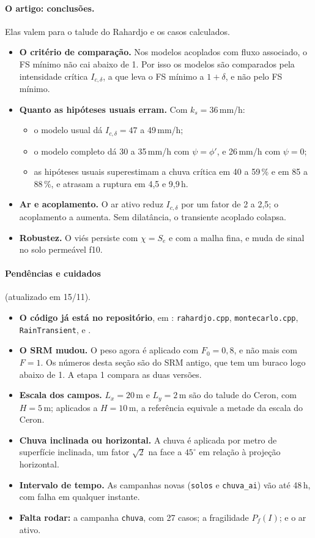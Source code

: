 \paragraph{O artigo: conclusões.} Elas valem para o talude do Rahardjo e os casos calculados.
\begin{itemize}
  \item \textbf{O critério de comparação.} Nos modelos acoplados com fluxo associado, o FS mínimo não cai abaixo de 1.
    Por isso os modelos são comparados pela intensidade crítica $I_{c,\delta}$, a que leva o FS mínimo a $1 + \delta$,
    e não pelo FS mínimo.
  \item \textbf{Quanto as hipóteses usuais erram.} Com $k_s = 36$\,mm/h:
    \begin{itemize}
      \item o modelo usual dá $I_{c,\delta} = 47$ a 49\,mm/h;
      \item o modelo completo dá 30 a 35\,mm/h com $\psi = \phi'$, e 26\,mm/h com $\psi = 0$;
      \item as hipóteses usuais superestimam a chuva crítica em 40 a 59\,\% e em 85 a 88\,\%, e atrasam a ruptura em
        4,5 e 9,9\,h.
    \end{itemize}
  \item \textbf{Ar e acoplamento.} O ar ativo reduz $I_{c,\delta}$ por um fator de 2 a 2,5; o acoplamento a aumenta. Sem
    dilatância, o transiente acoplado colapsa.
  \item \textbf{Robustez.} O viés persiste com $\chi = S_e$ e com a malha fina, e muda de sinal no solo permeável f10.
\end{itemize}

\paragraph{Pendências e cuidados} (atualizado em 15/11).
\begin{itemize}
  \item \textbf{O código já está no repositório}, em : \texttt{rahardjo.cpp},
    \texttt{montecarlo.cpp}, \texttt{RainTransient},  e .
  \item \textbf{O SRM mudou.} O peso agora é aplicado com $F_0 = 0{,}8$, e não mais com $F = 1$. Os números desta seção
    são do SRM antigo, que tem um buraco logo abaixo de 1. A etapa 1 compara as duas versões.
  \item \textbf{Escala dos campos.} $L_x = 20$\,m e $L_y = 2$\,m são do talude do Ceron, com $H = 5$\,m; aplicados a
    $H = 10$\,m, a referência equivale a metade da escala do Ceron.
  \item \textbf{Chuva inclinada ou horizontal.} A chuva é aplicada por metro de superfície inclinada, um fator $\sqrt2$ na
    face a $45^\circ$ em relação à projeção horizontal.
  \item \textbf{Intervalo de tempo.} As campanhas novas (\texttt{solos} e \texttt{chuva\_ai}) vão até 48\,h, com falha
    em qualquer instante.
  \item \textbf{Falta rodar:} a campanha \texttt{chuva}, com 27 casos; a fragilidade $P_f(I)$; e o ar ativo.
\end{itemize}
